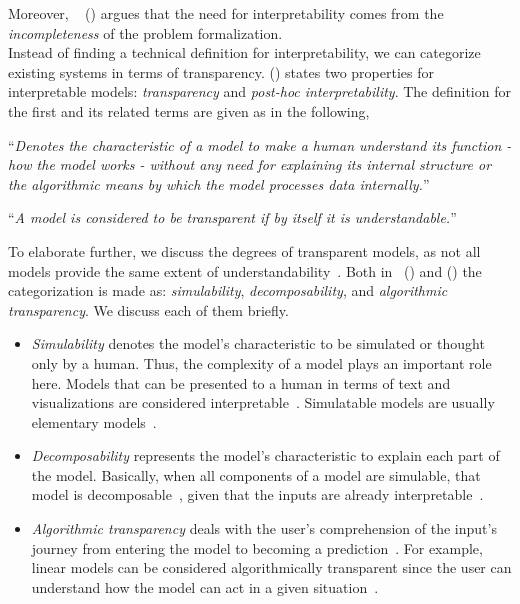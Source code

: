 Moreover, ~\citeauthor{TowardsARigorousScienceML_Velez} (\citeyear{TowardsARigorousScienceML_Velez}) argues that the need for interpretability comes from the \emph{incompleteness} of the problem formalization.\\
Instead of finding a technical definition for interpretability, we can categorize existing systems in terms of transparency.
\citeauthor{TheMythosOfModelInterpretability_Lipton} (\citeyear{TheMythosOfModelInterpretability_Lipton}) states two properties for interpretable models: \emph{transparency} and \emph{post-hoc interpretability}. The definition for the first and its related terms are given as in the following,
\begin{definition}
    “\emph{Denotes the characteristic of a model to make a human understand its function - how the model works - without any need for explaining its internal structure or the algorithmic means by which the model processes data internally.}”~\parencite{XAIConceptsTaxonomies_Arrieta}
\end{definition}
\begin{definition}
    “\emph{A model is considered to be transparent if by itself it is understandable.}”~\parencite{XAIConceptsTaxonomies_Arrieta}
\end{definition}
To elaborate further, we discuss the degrees of transparent models, as not all models provide the same extent of understandability~\parencite{XAIConceptsTaxonomies_Arrieta}. Both in~\citeauthor{TheMythosOfModelInterpretability_Lipton} (\citeyear{TheMythosOfModelInterpretability_Lipton}) and \citeauthor{XAIConceptsTaxonomies_Arrieta} (\citeyear{XAIConceptsTaxonomies_Arrieta}) the categorization is made as: \emph{simulability}, \emph{decomposability}, and \emph{algorithmic transparency}. We discuss each of them briefly.
\begin{itemize}
    \item \emph{Simulability} denotes the model’s characteristic to be simulated or thought only by a human. Thus, the complexity of a model plays an important role here. Models that can be presented to a human in terms of text and visualizations are considered interpretable~\parencite{WhyShouldITrustYou_Riberio}. Simulatable models are usually elementary models~\parencite{XAIConceptsTaxonomies_Arrieta, RegressionShrinkage_Tibshirani}.
    \item \emph{Decomposability} represents the model’s characteristic to explain each part of the model. Basically, when all components of a model are simulable, that model is decomposable~\parencite{TheMythosOfModelInterpretability_Lipton}, given that the inputs are already interpretable~\parencite{XAIConceptsTaxonomies_Arrieta}.
    \item \emph{Algorithmic transparency} deals with the user’s comprehension of the input’s journey from entering the model to becoming a prediction~\parencite{TheMythosOfModelInterpretability_Lipton, XAIConceptsTaxonomies_Arrieta}. For example, linear models can be considered algorithmically transparent since the user can understand how the model can act in a given situation~\parencite{AnIntroductionToStatisticalLearning_Gareth}.
\end{itemize}
